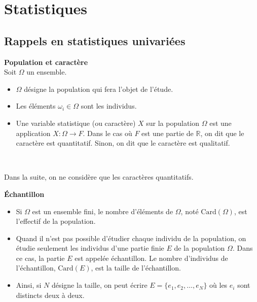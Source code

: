 \documentclass[../PolyS4.tex]{subfiles}
\begin{document}
\setcounter{chapter}{1}
\chapter{Statistiques}


\section{Rappels en statistiques univariées}

\begin{Def}\textbf{Population et caractère}\\

Soit $\Omega$ un ensemble.
\begin{itemize}
    \item $\Omega$ désigne la population qui fera l'objet de l'étude.
    \item Les éléments $\omega_i \in \Omega$ sont les individus.
    \item Une variable statistique (ou caractère) $X$ sur la population $\Omega$ est une application $X : \Omega \to F$. Dans le cas où $F$ est une partie de $\mathbb{R}$, on dit que le caractère est quantitatif. Sinon, on dit que le caractère est qualitatif.
\end{itemize}
\end{Def}

\begin{Rmq}$\,$

Dans la suite, on ne considère que les caractères quantitatifs.
\end{Rmq}

\begin{Def}\textbf{Échantillon}\\

\begin{itemize}
    \item Si $\Omega$ est un ensemble fini, le nombre d'éléments de $\Omega$, noté $\text{Card}(\Omega)$, est l'effectif de la population.
    \item Quand il n'est pas possible d'étudier chaque individu de la population, on étudie seulement les individus d'une partie finie $E$ de la population $\Omega$. Dans ce cas, la partie $E$ est appelée échantillon. Le nombre d'individus de l'échantillon, $\text{Card}(E)$, est la taille de l'échantillon.
    \item Ainsi, si $N$ désigne la taille, on peut écrire $E = \{e_1, e_2, \ldots, e_N\}$ où les $e_i$ sont distincts deux à deux.
\end{itemize}
\end{Def}
\end{document}
